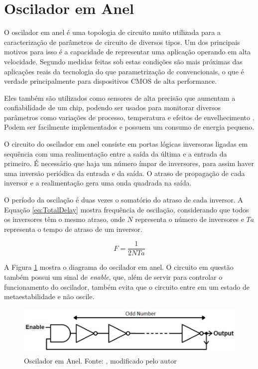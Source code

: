 \section{Oscilador em Anel}
O oscilador em anel é uma topologia de circuito muito utilizada para a caracterização de parâmetros de circuito de diversos tipos. Um dos principais motivos para isso é a capacidade de representar uma aplicação operando em alta velocidade. Segundo \cite{Bhushan} medidas feitas sob estas condições são mais próximas das aplicações reais da tecnologia do que parametrização dc convencionais, o que é verdade principalmente para dispositivos CMOS de alta performance.

Eles também são utilizados como sensores de alta precisão que aumentam a confiabilidade de um chip, podendo ser usados para monitorar diversos parâmetros como variações de processo, temperatura e efeitos de envelhecimento \cite{Sato}. Podem ser facilmente implementados e possuem um consumo de energia pequeno.

O circuito do oscilador em anel consiste em portas lógicas inversoras ligadas em sequência com uma realimentação entre a saída da última e a entrada da primeiro. É necessário que haja um número ímpar de inversores, para assim haver uma inversão periódica da entrada e da saída. O atraso de propagação de cada inversor e a realimentação gera uma onda quadrada na saída.

O período da oscilação é duas vezes o somatório do atraso de cada inversor. A Equação \ref{eq:TotalDelay} mostra frequência de oscilação, considerando que todos os inversores têm o mesmo atraso, onde $N$ representa o número de inversores e $Ta$ representa o tempo de atraso de um inversor.

\begin{equation}
    F = \frac{1}{2NTa}
    \label{eq:TotalDelay}
\end{equation}
         
A Figura \ref{fig:RingOsc} mostra o diagrama do oscilador em anel. O circuito em questão também possui um sinal de \textit{enable}, que, além de servir para controlar o funcionamento do oscilador, também evita que o circuito entre em um estado de metaestabilidade e não oscile.

\begin{figure}[H]
    \centering
    \includegraphics[width=\linewidth]{figures/ReferencialTeorico/RingOscModified.png}
    \caption{Oscilador em Anel. Fonte: \cite{Sparkfun}, modificado pelo autor}
    \label{fig:RingOsc}
\end{figure}

